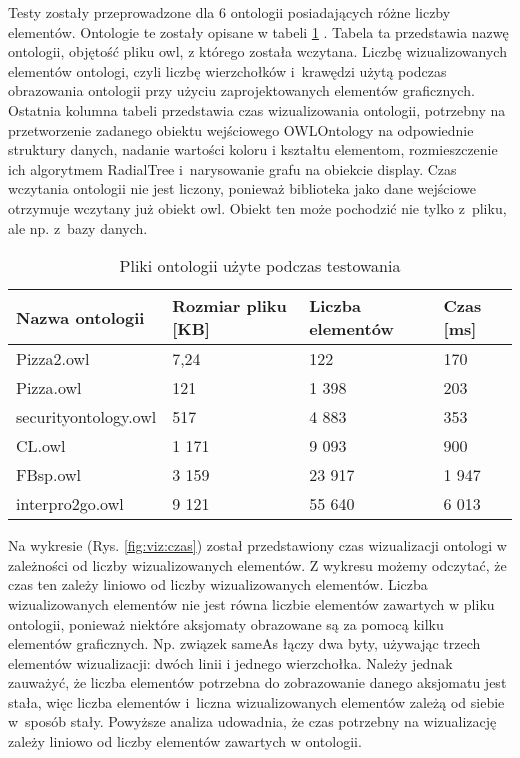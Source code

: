 Testy zostały przeprowadzone dla 6 ontologii posiadających różne liczby elementów. Ontologie te zostały opisane w tabeli \ref{t:ontologie} . Tabela ta przedstawia 
nazwę ontologii, 
objętość pliku owl, z którego została wczytana. Liczbę wizualizowanych elementów ontologi, czyli liczbę wierzchołków i~krawędzi użytą podczas obrazowania ontologii przy 
użyciu zaprojektowanych elementów graficznych. Ostatnia kolumna tabeli przedstawia czas wizualizowania ontologii, potrzebny na przetworzenie zadanego obiektu
 wejściowego OWLOntology na odpowiednie struktury danych, nadanie wartości koloru i kształtu  elementom, rozmieszczenie ich algorytmem RadialTree i~narysowanie grafu na 
obiekcie display. Czas wczytania ontologii nie jest liczony, ponieważ biblioteka jako dane wejściowe otrzymuje wczytany już obiekt owl. Obiekt ten może pochodzić nie tylko z~pliku, ale 
np. z~bazy danych. 


\begin{longtable}{|m{4cm}|m{3cm}|m{3cm}|m{3cm}|} 
\caption{Pliki ontologii użyte podczas testowania}
\label{t:ontologie} \\
\hline
\bf{Nazwa ontologii} 	&  \bf{Rozmiar pliku [KB]} & \bf{Liczba \newline elementów} & \bf{Czas [ms]} \\ \hline

Pizza2.owl & 7,24 & 122 & 170\\ \hline
Pizza.owl & 121 & 1 398 & 203 \\ \hline
securityontology.owl & 517 & 4 883 & 353 \\ \hline
CL.owl & 1 171 & 9 093 & 900 \\ \hline
FBsp.owl& 3 159 & 23 917 & 1 947 \\ \hline
interpro2go.owl& 9 121 & 55 640 &  6 013\\ \hline
\end{longtable}

Na wykresie (Rys. \ref{fig:viz:czas}) został przedstawiony czas wizualizacji ontologi w zależności od liczby wizualizowanych elementów. Z wykresu możemy odczytać, że 
czas ten zależy liniowo od liczby wizualizowanych elementów. Liczba wizualizowanych elementów nie jest równa liczbie elementów zawartych w pliku ontologii, ponieważ niektóre
aksjomaty obrazowane są za pomocą kilku elementów graficznych. Np. związek sameAs łączy dwa byty, używając trzech elementów wizualizacji: dwóch linii i jednego wierzchołka. 
Należy jednak zauważyć, że liczba elementów potrzebna do zobrazowanie danego aksjomatu jest stała, więc liczba elementów i~liczna wizualizowanych elementów zależą
 od siebie w~sposób stały. Powyższe analiza udowadnia, że czas potrzebny na wizualizację zależy liniowo od liczby elementów zawartych w ontologii. 

